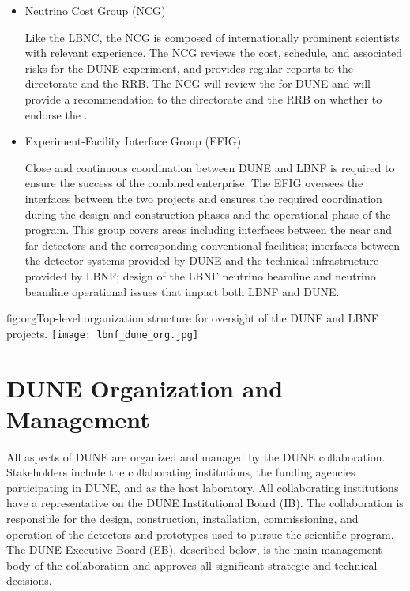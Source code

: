 \begin{itemize}

Upon request from the Fermilab director, the LBNC may employ additional DUNE and LBNF scrutiny groups for more detailed reports and evaluations. 

\item Neutrino Cost Group (NCG)

Like the LBNC, the NCG is composed of internationally prominent scientists with relevant experience.  The NCG reviews the cost, schedule, and associated risks for the DUNE experiment, and provides regular reports to the \fnal directorate and the RRB.  The NCG will review the  for DUNE and will provide a recommendation to the \fnal directorate and the RRB on whether to endorse the .


\item Experiment-Facility Interface Group (EFIG)

Close and continuous coordination between DUNE and LBNF is required to ensure the success of the combined enterprise. The EFIG  oversees the interfaces between the two projects and ensures the required coordination during the design and construction phases and the operational phase of the program. This group covers areas including interfaces between the near and far detectors and the corresponding conventional facilities; interfaces between the detector systems provided by DUNE and the technical infrastructure provided by LBNF; design of the LBNF neutrino beamline and neutrino beamline operational issues that impact both LBNF and DUNE.  

\end{itemize}

\begin{dunefigure}	
{fig:org}{Top-level organization structure for oversight of the DUNE and LBNF projects.}
\texttt{[image: lbnf\_dune\_org.jpg]}
\end{dunefigure}

\section{DUNE Organization and Management}

All aspects of DUNE are organized and managed by the DUNE collaboration.  Stakeholders include the collaborating institutions, the funding agencies participating in DUNE, and \fnal as the host laboratory.  All collaborating institutions have a representative on the DUNE Institutional Board (IB). The collaboration is responsible for the design, construction, installation, commissioning, and operation of the detectors and prototypes used to pursue the scientific program. The DUNE Executive Board (EB), described below, is the main management body of the collaboration and approves all significant strategic and technical decisions.

